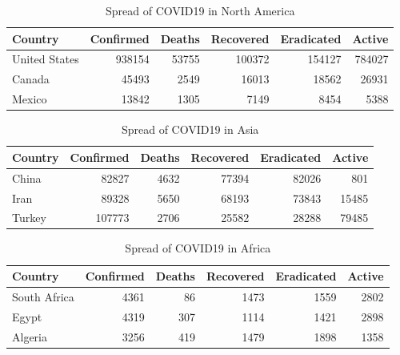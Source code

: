 \documentclass{homework}
\begin{document}
\begin{table}[H]
  \caption{Spread of COVID19 in North America}
  \label{North America Spread}
  \centering
  \begin{tabular}{lrrrrr}
    \toprule
    Country       & Confirmed & Deaths & Recovered & Eradicated & Active \\
    \midrule
    United States & 938154    & 53755  & 100372    & 154127     & 784027 \\
    Canada        & 45493     & 2549   & 16013     & 18562      & 26931  \\
    Mexico        & 13842     & 1305   & 7149      & 8454       & 5388   \\
    \bottomrule
  \end{tabular}
\end{table}

\vspace{-1.5em}

\begin{table}[H]
  \caption{Spread of COVID19 in Asia}
  \label{Asia Spread}
  \centering
  \begin{tabular}{lrrrrr}
    \toprule
    Country & Confirmed & Deaths & Recovered & Eradicated & Active \\
    \midrule
    China   & 82827     & 4632   & 77394     & 82026      & 801    \\
    Iran    & 89328     & 5650   & 68193     & 73843      & 15485  \\
    Turkey  & 107773    & 2706   & 25582     & 28288      & 79485  \\
    \bottomrule
  \end{tabular}
\end{table}

\vspace{-1.5em}

\begin{table}[H]
  \caption{Spread of COVID19 in Africa}
  \label{Africa Spread}
  \centering
  \begin{tabular}{lrrrrr}
    \toprule
    Country      & Confirmed & Deaths & Recovered & Eradicated & Active \\
    \midrule
    South Africa & 4361      & 86     & 1473      & 1559       & 2802   \\
    Egypt        & 4319      & 307    & 1114      & 1421       & 2898   \\
    Algeria      & 3256      & 419    & 1479      & 1898       & 1358   \\
    \bottomrule
  \end{tabular}
\end{table}
\end{document}
